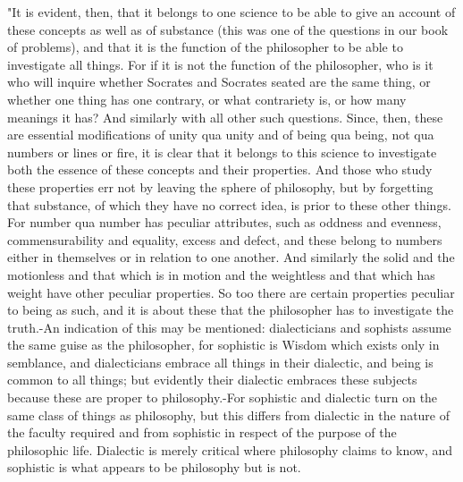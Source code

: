 "It is evident, then, that it belongs to one science to be able to
give an account of these concepts as well as of substance (this was
one of the questions in our book of problems), and that it is the
function of the philosopher to be able to investigate all things.
For if it is not the function of the philosopher, who is it who will
inquire whether Socrates and Socrates seated are the same thing, or
whether one thing has one contrary, or what contrariety is, or how
many meanings it has? And similarly with all other such questions.
Since, then, these are essential modifications of unity qua unity
and of being qua being, not qua numbers or lines or fire, it is clear
that it belongs to this science to investigate both the essence of
these concepts and their properties. And those who study these properties
err not by leaving the sphere of philosophy, but by forgetting that
substance, of which they have no correct idea, is prior to these other
things. For number qua number has peculiar attributes, such as oddness
and evenness, commensurability and equality, excess and defect, and
these belong to numbers either in themselves or in relation to one
another. And similarly the solid and the motionless and that which
is in motion and the weightless and that which has weight have other
peculiar properties. So too there are certain properties peculiar
to being as such, and it is about these that the philosopher has to
investigate the truth.-An indication of this may be mentioned: dialecticians
and sophists assume the same guise as the philosopher, for sophistic
is Wisdom which exists only in semblance, and dialecticians embrace
all things in their dialectic, and being is common to all things;
but evidently their dialectic embraces these subjects because these
are proper to philosophy.-For sophistic and dialectic turn on the
same class of things as philosophy, but this differs from dialectic
in the nature of the faculty required and from sophistic in respect
of the purpose of the philosophic life. Dialectic is merely critical
where philosophy claims to know, and sophistic is what appears to
be philosophy but is not. 

